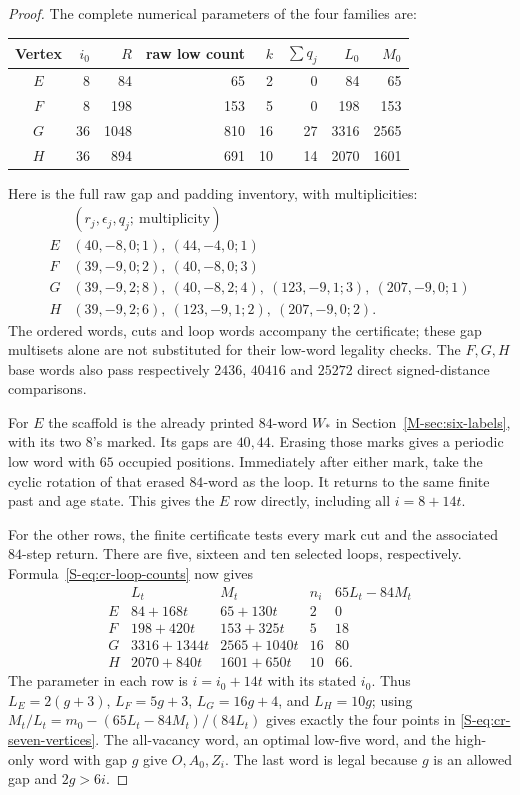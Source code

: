 \documentclass[11pt,reqno]{amsart}
\theoremstyle{plain}
\theoremstyle{plain}
\theoremstyle{plain}
\begin{document}
\begin{proof}
The complete numerical parameters of the four families are:
\begin{center}\small
\begin{tabular}{@{}crrrrrrr@{}}\toprule
Vertex&$i_0$&$R$&raw low count&$k$&$\sum q_j$&$L_0$&$M_0$\\\midrule
$E$&8&84&65&2&0&84&65\\
$F$&8&198&153&5&0&198&153\\
$G$&36&1048&810&16&27&3316&2565\\
$H$&36&894&691&10&14&2070&1601\\\bottomrule
\end{tabular}
\end{center}
Here is the full raw gap and padding inventory, with multiplicities:
\[
 \begin{array}{c|l}
 & (r_j,\epsilon_j,q_j;\ \text{multiplicity})\\\hline
 E&(40,-8,0;1),\ (44,-4,0;1)\\
 F&(39,-9,0;2),\ (40,-8,0;3)\\
 G&(39,-9,2;8),\ (40,-8,2;4),\
          (123,-9,1;3),\ (207,-9,0;1)\\
 H&(39,-9,2;6),\ (123,-9,1;2),\ (207,-9,0;2).
 \end{array}
\]
The ordered words, cuts and loop words accompany the certificate;
these gap multisets alone are not substituted for their low-word
legality checks. The $F,G,H$ base words also pass respectively
$2436$, $40416$ and $25272$ direct signed-distance comparisons.

For $E$ the scaffold is the already printed $84$-word $W_*$
in Section~\ref*{M-sec:six-labels}, with its two $8$'s marked. Its
gaps are $40,44$. Erasing those marks gives a periodic low word
with $65$ occupied positions. Immediately after either mark,
take the cyclic rotation of that erased $84$-word as the loop.
It returns to the same finite past and age state. This gives the
$E$ row directly, including all $i=8+14t$.

For the other rows, the finite certificate tests every mark cut
and the associated $84$-step return. There are five, sixteen and
ten selected loops, respectively. Formula~\eqref{S-eq:cr-loop-counts}
now gives
\[
 \begin{array}{c|ccc|c}
 &L_t&M_t&n_i&65L_t-84M_t\\\hline
 E&84+168t&65+130t&2&0\\
 F&198+420t&153+325t&5&18\\
 G&3316+1344t&2565+1040t&16&80\\
 H&2070+840t&1601+650t&10&66.
 \end{array}
\]
The parameter in each row is $i=i_0+14t$ with its stated $i_0$.
Thus $L_E=2(g+3)$, $L_F=5g+3$, $L_G=16g+4$, and $L_H=10g$;
using $M_t/L_t=m_0-(65L_t-84M_t)/(84L_t)$ gives exactly the four
points in \eqref{S-eq:cr-seven-vertices}. The all-vacancy word,
an optimal low-five word, and the high-only word with gap $g$
give $O,A_0,Z_i$. The last word is legal because $g$ is an
allowed gap and $2g>6i$.


\end{proof}
\end{document}
